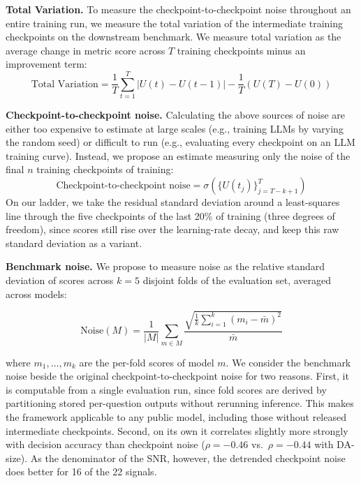\textbf{Total Variation.} To measure the checkpoint-to-checkpoint noise{} throughout an entire training run, we measure the total variation of the intermediate training checkpoints on the downstream benchmark. We measure total variation as the average change in metric score across $T$ training checkpoints minus an improvement term:
\label{app:total-variation}
\begin{equation}
\text{Total Variation} = \textstyle\frac{1}{T} \sum_{t=1}^{T} |U(t) - U(t-1)| - \frac{1}{T}(U(T) - U(0))
\end{equation}

\textbf{Checkpoint-to-checkpoint noise{}.} 
Calculating the above sources of noise{} are either too expensive to estimate at large scales (e.g., training LLMs by varying the random seed) or difficult to run (e.g., evaluating every checkpoint on an LLM training curve). Instead, we propose an estimate measuring only the noise{} of the final $n$ training checkpoints of training:
\begin{equation}
\text{Checkpoint-to-checkpoint noise{}} = \textstyle\sigma\left(\{U(t_j)\}_{j=T-k+1}^{T}\right)
\end{equation}
On our ladder, we take the residual standard deviation around a least-squares line through the five checkpoints of the last 20\% of training (three degrees of freedom), since scores still rise over the learning-rate decay, and keep this raw standard deviation as a variant.

\textbf{Benchmark noise.} We propose to measure noise as the relative standard deviation of scores across $k = 5$ disjoint folds of the evaluation set, averaged across models:

$$\text{Noise}(M) = \frac{1}{|M|} \sum_{m \in M} \frac{\sqrt{\frac{1}{k}\sum_{i=1}^{k}(m_i - \bar{m})^2}}{\bar{m}}$$

where $m_1, \dots, m_k$ are the per-fold scores of model $m$. We consider the benchmark noise beside the original checkpoint-to-checkpoint noise for two reasons. First, it is computable from a single evaluation run, since fold scores are derived by partitioning stored per-question outputs without rerunning inference. This makes the framework applicable to any public model, including those without released intermediate checkpoints. Second, on its own it correlates slightly more strongly with decision accuracy than checkpoint noise ($\rho = -0.46$ vs.\ $\rho = -0.44$ with DA-size). As the denominator of the SNR, however, the detrended checkpoint noise does better for 16 of the 22 signals.



